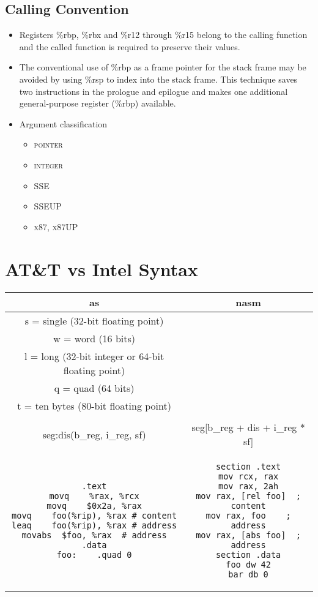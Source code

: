 \documentclass[a4paper,12pt]{article}
\begin{document}
\subsection{Calling Convention}
\begin{itemize}
\item Registers \%rbp, \%rbx and \%r12 through \%r15 belong to the calling function and the called function is required to preserve their values.
\item The conventional use of \%rbp as a frame pointer for the stack frame may be avoided by using \%rsp to index into the stack frame. This technique saves two instructions in the prologue and epilogue and makes one additional general-purpose register (\%rbp) available.
\item Argument classification
\begin{itemize}
\item \textsc{pointer}
\item \textsc{integer}
\item \textsc{SSE}
\item \textsc{SSEUP}
\item \textsc{x87, x87UP}
\end{itemize}
\end{itemize}

\section{AT\&T vs Intel Syntax}
\begin{tabular}{|c|c|}
\hline
\lstset{language=[x86masm]Assembler}
as & nasm
\\
\hline
 s = single (32-bit floating point) \\
 w = word (16 bits) \\
 l = long (32-bit integer or 64-bit floating point) \\
 q = quad (64 bits) \\ 
 t = ten bytes (80-bit floating point) \\
\\
\hline
seg:dis(b\_reg, i\_reg, sf) &
seg[b\_reg + dis + i\_reg * sf]
\\
\hline
\begin{lstlisting}
.text
movq	%rax, %rcx
movq	$0x2a, %rax
movq	foo(%rip), %rax	# content
leaq	foo(%rip), %rax	# address
movabs	$foo, %rax 	# address
.data
foo:	.quad 0
\end{lstlisting}
&
\begin{lstlisting}
section .text
mov	rcx, rax
mov	rax, 2ah
mov	rax, [rel foo]	; content
mov	rax, foo 	; address
mov	rax, [abs foo]	; address
section .data
foo	dw 42
bar	db 0
\end{lstlisting}
\\
\hline
\end{tabular}
\end{document}
